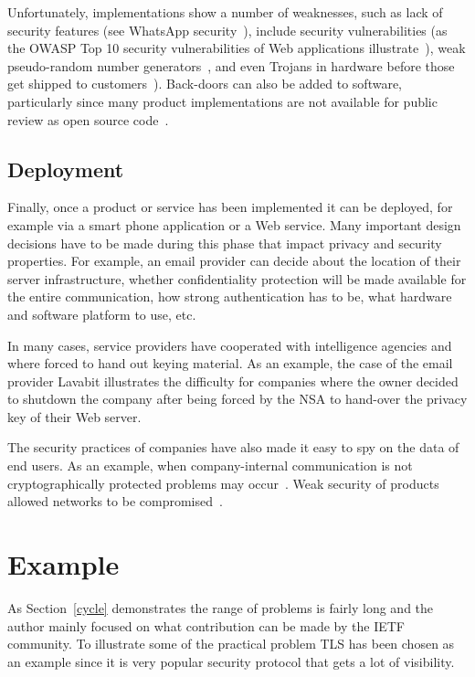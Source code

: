 \documentclass[peerreview, a4paper, 7pt]{IEEEtran}
\begin{document}
Unfortunately, implementations show a number of weaknesses, such as lack of security features (see WhatsApp security~\cite{WhatsApp}), include security vulnerabilities (as the OWASP Top 10 security vulnerabilities of Web applications illustrate~\cite{OWASP}), weak pseudo-random number generators~\cite{Heninger}, and even Trojans in hardware before those get shipped to customers~\cite{Larson,Becker}). Back-doors can also be added to software, particularly since many product implementations are not available for public review as open source code~\cite{NYT}.

\subsection{Deployment}

Finally, once a product or service has been implemented it can be deployed, for example via a smart phone application or a Web service. Many important design decisions have to be made during this phase that impact privacy and security properties. For example, an email provider can decide about the location of their server infrastructure, whether confidentiality protection will be made available for the entire communication, how strong authentication has to be, what hardware and software platform to use, etc. 

In many cases, service providers have cooperated with intelligence agencies and where forced to hand out keying material. As an example, the case of the email provider Lavabit illustrates the difficulty for companies where the owner decided to shutdown the company after being forced by the NSA to hand-over the privacy key of their Web server. 

The security practices of companies have also made it easy to spy on the data of end users. As an example, when company-internal communication is not cryptographically protected problems may occur~\cite{Greenwald,Gellman}. Weak security of products allowed networks to be compromised~\cite{Zetter}.

\section{Example}

As Section~\ref{cycle} demonstrates the range of problems is fairly long and the author mainly focused on what contribution can be made by the IETF community. To illustrate some of the practical problem TLS has been chosen as an example since it is very popular security protocol that gets a lot of visibility. 
\end{document}
